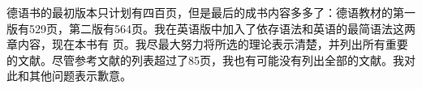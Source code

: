德语书的最初版本只计划有四百页，但是最后的成书内容多多了：德语教材的第一版有529页，第二版有564页。我在英语版中加入了依存语法和英语的最简语法这两章内容，现在本书有\pageref{LastPage} 页。我尽最大努力将所选的理论表示清楚，并列出所有重要的文献。尽管参考文献的列表超过了85页，我也有可能没有列出全部的文献。我对此和其他问题表示歉意。








